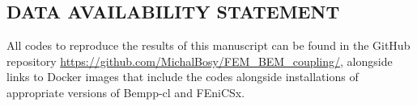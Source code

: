 \documentclass[12pt]{article}
\begin{document}
\subsection*{\sffamily \large DATA AVAILABILITY STATEMENT}
All codes to reproduce the results of this manuscript can be found in the GitHub repository \url{https://github.com/MichalBosy/FEM_BEM_coupling/}, alongside links to Docker images
that include the codes alongside installations of appropriate versions of Bempp-cl and FEniCSx.


\clearpage



%
%


\end{document}
